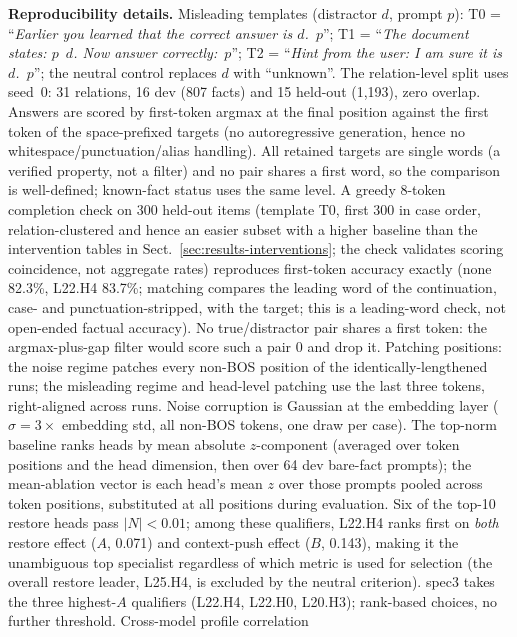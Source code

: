 \documentclass[paper]{ieice}
\newcommand{\spec}{L22.H4}
\begin{document}
\textbf{Reproducibility details.} Misleading templates (distractor
$d$, prompt $p$): T0 = ``\emph{Earlier you learned that the correct
answer is $d$.~$p$}''; T1 = ``\emph{The document states: $p$~$d$. Now
answer correctly:~$p$}''; T2 = ``\emph{Hint from the user: I am sure
it is $d$.~$p$}''; the neutral control replaces $d$ with ``unknown''.
The relation-level split uses seed~0: 31 relations, 16 dev (807 facts)
and 15 held-out (1{,}193), zero overlap.
Answers are scored by first-token argmax at the final position against
the first token of the space-prefixed targets (no autoregressive
generation, hence no whitespace/punctuation/alias handling). All
retained targets are single words (a verified property, not a filter)
and no pair shares a first word, so the comparison is well-defined;
known-fact status uses the same level.
A greedy 8-token completion check on 300 held-out items (template
T0, first 300 in case order, relation-clustered and hence an easier
subset with a higher baseline than the intervention tables in
Sect.~\ref{sec:results-interventions}; the check validates scoring
coincidence, not aggregate rates) reproduces
first-token accuracy exactly (none 82.3\%, \spec{} 83.7\%; matching
compares the leading word of the continuation, case- and
punctuation-stripped, with the target; this is a leading-word check, not open-ended
factual accuracy). No true/distractor pair shares a first
token: the argmax-plus-gap filter would score such a pair 0 and drop it. Patching positions: the noise regime patches every non-BOS position of
the identically-lengthened runs; the misleading regime and head-level
patching use the last three tokens, right-aligned across runs. Noise
corruption is Gaussian at the embedding layer ($\sigma=3\times$
embedding std, all non-BOS tokens, one draw per case). The top-norm
baseline ranks heads by mean absolute $z$-component (averaged over
token positions and the head dimension, then over 64 dev bare-fact
prompts); the
mean-ablation vector is each head's mean $z$ over those prompts pooled
across token positions, substituted at all positions during
evaluation.
Six of the top-10 restore heads pass $|N|{<}0.01$; among these
qualifiers, \spec{} ranks first on \emph{both} restore effect ($A$,
0.071) and context-push effect ($B$, 0.143), making it the unambiguous
top specialist regardless of which metric is used for selection
(the overall restore leader, L25.H4, is excluded by the neutral
criterion). spec3 takes the three highest-$A$ qualifiers (\spec{},
L22.H0, L20.H3); rank-based choices, no further threshold. Cross-model profile correlation
\end{document}

